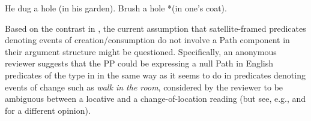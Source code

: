 \documentclass[output=paper,colorlinks,citecolor=brown]{langscibook}
\begin{document}
\ea \label{dugbrushhole} \ea \label{dugnoPP} He dug a hole (in his garden).
\ex \label{brushnoPP} Brush a hole *(in one's coat). \z \z

\noindent Based on the contrast in , the current assumption that satellite-framed predicates denoting events of creation/consumption do not involve a Path component in their argument structure might be questioned. Specifically, an anonymous reviewer suggests that the PP could be expressing a null Path in English predicates of the type in  in the same way as it seems to do in predicates denoting events of change such as \textit{walk in the room}, considered by the reviewer to be ambiguous between a locative and a change-of-location reading (but see, e.g., \citealt[83]{FolliAndRamchand2005} and \citealt[90]{big:Gehrke2008} for a different opinion).
\end{document}
